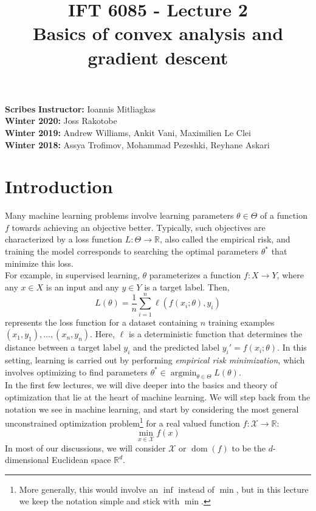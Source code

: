 \documentclass{article}
\title{IFT 6085 - Lecture 2 \\ 
Basics of convex analysis and gradient descent }
\date{}
\DeclareMathOperator*{\argmin}{\arg\min}
\DeclareMathOperator*{\dom}{dom}
\newcommand{\R}{\mathbb{R}}
\newcommand{\X}{\mathcal{X}}
\begin{document}
 

\maketitle


\textbf{Scribes}\hfill
\textbf{Instructor:}  Ioannis Mitliagkas\\
\textbf{Winter 2020:} Joss Rakotobe\\
\textbf{Winter 2019:} Andrew Williams, Ankit Vani, Maximilien Le Clei\\
\textbf{Winter 2018:} Assya Trofimov, Mohammad Pezeshki, Reyhane Askari



\newcommand{\infgc}{\inf_{g \in \mathcal{C}}}
\newcommand{\supgc}{\sup_{g \in \mathcal{C}}}


\section{Introduction}
 
Many machine learning problems involve learning parameters $\theta \in \Theta$ of a function $f$ towards achieving an objective better. Typically, such objectives are characterized by a loss function $L: \Theta\to\R$, also called the empirical risk, and training the model corresponds to searching the optimal parameters $\theta^\ast$ that minimize this loss.\\

For example, in supervised learning, $\theta$ parameterizes a function $f: X\to Y$, where any $x \in X$ is an input and any $y \in Y$ is a target label. Then,
\[
L(\theta) = \frac{1}{n}\sum_{i=1}^n \ell(f(x_i; \theta), y_i)
\]
represents the loss function for a dataset containing $n$ training examples $(x_1,y_1),\ldots,(x_n,y_n)$. Here, $\ell$ is a deterministic function that determines the distance between a target label $y_i$ and the predicted label $y_i' = f(x_i; \theta)$. In this setting, learning is carried out by performing \emph{empirical risk minimization}, which involves optimizing to find parameters $\theta^\ast \in \argmin_{\theta\in\Theta} L(\theta)$.\\

In the first few lectures, we will dive deeper into the basics and theory of optimization that lie at the heart of machine learning. We will step back from the notation we see in machine learning, and start by considering the most general unconstrained optimization problem\footnote{More generally, this would involve an $\inf$ instead of $\min$, but in this lecture we keep the notation simple and stick with $\min$.} for a real valued function $f:\X\to\R$:
\[
\min_{x\in\X} f(x)
\]
In most of our discussions, we will consider $\X$ or $\dom(f)$ to be the $d$-dimensional Euclidean space $\R^d$.\\
\end{document}
